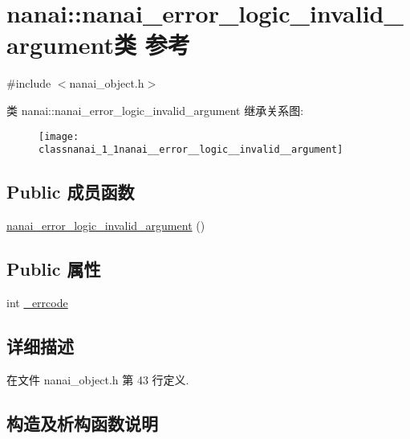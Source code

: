 \hypertarget{classnanai_1_1nanai__error__logic__invalid__argument}{}\section{nanai\+:\+:nanai\+\_\+error\+\_\+logic\+\_\+invalid\+\_\+argument类 参考}
\label{classnanai_1_1nanai__error__logic__invalid__argument}


{\ttfamily \#include $<$nanai\+\_\+object.\+h$>$}

类 nanai\+:\+:nanai\+\_\+error\+\_\+logic\+\_\+invalid\+\_\+argument 继承关系图\+:\begin{figure}[H]
\begin{center}
\leavevmode
\texttt{[image: classnanai\_1\_1nanai\_\_error\_\_logic\_\_invalid\_\_argument]}
\end{center}
\end{figure}
\subsection*{Public 成员函数}
\begin{DoxyCompactItemize}
\item 
\hyperlink{classnanai_1_1nanai__error__logic__invalid__argument_a4a7a923d0bdaff2a9a450bdfe946adf2}{nanai\+\_\+error\+\_\+logic\+\_\+invalid\+\_\+argument} ()
\end{DoxyCompactItemize}
\subsection*{Public 属性}
\begin{DoxyCompactItemize}
\item 
int \hyperlink{classnanai_1_1nanai__error__logic__invalid__argument_a7a983c95e803de2afbc6220ca65496f4}{\+\_\+errcode}
\end{DoxyCompactItemize}


\subsection{详细描述}


在文件 nanai\+\_\+object.\+h 第 43 行定义.



\subsection{构造及析构函数说明}
\hypertarget{classnanai_1_1nanai__error__logic__invalid__argument_a4a7a923d0bdaff2a9a450bdfe946adf2}{}
